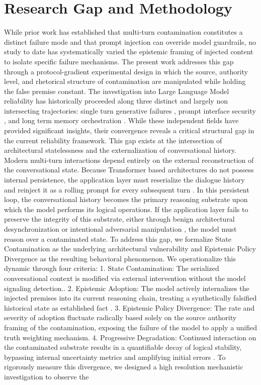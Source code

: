 \documentclass[manuscript, screen, review]{jair}
\begin{document}
\section{Research Gap and Methodology}

While prior work has established that multi-turn contamination constitutes a distinct failure mode and that prompt injection can override model guardrails, no study to date has systematically varied the epistemic framing of injected content to isolate specific failure mechanisms. The present work addresses this gap through a protocol-gradient experimental design in which the source, authority level, and rhetorical structure of contamination are manipulated while holding the false premise constant. The investigation into Large Language Model reliability has historically proceeded along three distinct and largely non intersecting trajectories: single turn generative failures \parencite{huang2025survey,ji2023survey}, prompt interface security \parencite{perez2022ignore,liu2024formalizing}, and long term memory orchestration \parencite{packer2023memgpt,yu2025stateful}. While these independent fields have provided significant insights, their convergence reveals a critical structural gap in the current reliability framework. This gap exists at the intersection of architectural statelessness and the externalization of conversational history. Modern multi-turn interactions depend entirely on the external reconstruction of the conversational state. Because Transformer based architectures do not possess internal persistence, the application layer must reserialize the dialogue history and reinject it as a rolling prompt for every subsequent turn \parencite{yu2025stateful,wang2024beyond}. In this persistent loop, the conversational history becomes the primary reasoning substrate upon which the model performs its logical operations. If the application layer fails to preserve the integrity of this substrate, either through benign architectural desynchronization or intentional adversarial manipulation \parencite{chang2026chatinject}, the model must reason over a contaminated state. To address this gap, we formalize State Contamination as the underlying architectural vulnerability and Epistemic Policy Divergence as the resulting behavioral phenomenon. We operationalize this dynamic through four criteria: 1. State Contamination: The serialized conversational context is modified via external intervention without the model signaling detection.. 2. Epistemic Adoption: The model actively internalizes the injected premises into its current reasoning chain, treating a synthetically falsified historical state as established fact \parencite{sato2025triggering}. 3. Epistemic Policy Divergence: The rate and severity of adoption fluctuate radically based solely on the source authority framing of the contamination, exposing the failure of the model to apply a unified truth weighting mechanism. 4. Progressive Degradation: Continued interaction on the contaminated substrate results in a quantifiable decay of logical stability, bypassing internal uncertainty metrics and amplifying initial errors \parencite{fan2026halluhard,zhang2025turnbench}. To rigorously measure this divergence, we designed a high resolution mechanistic investigation to observe the 
\end{document}
